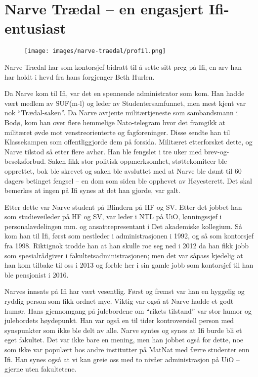 \chapter{Narve Trædal -- en engasjert Ifi-entusiast}

\author{Skrevet av Dag Langmyhr og Arne Maus}

\begin{figure}
	\texttt{[image: images/narve-traedal/profil.png]}
	\label{fig:narve-traedal}
\end{figure}

Narve Trædal har som kontorsjef bidratt til å sette sitt preg på Ifi, en arv han har holdt i hevd fra hans forgjenger Beth Hurlen.

Da Narve kom til Ifi, var det en spennende administrator som kom. Han hadde vært medlem av SUF(m-l) og leder av Studentersamfunnet, men mest kjent var nok ``Trædal-saken''. Da Narve avtjente militærtjeneste som sambandsmann i Bodø, kom han over flere hemmelige Nato-telegram hvor det framgikk at militæret øvde mot venstreorienterte og fagforeninger. Disse sendte han til Klassekampen som offentliggjorde dem på forsida. Militæret etterforsket dette, og Narve tilstod så etter flere avhør. Han ble fengslet i tre uker med brev-og-besøksforbud. Saken fikk stor politisk oppmerksomhet, støttekomiteer ble opprettet, bok ble skrevet og saken ble avsluttet med at Narve ble dømt til 60 dagers betinget fengsel – en dom som siden ble opphevet av Høyesterett. Det skal bemerkes at ingen på Ifi synes at det han gjorde, var galt.

Etter dette var Narve student på Blindern på HF og SV. Etter det jobbet han som studieveileder på HF og SV, var leder i NTL på UiO, lønningssjef i personalavdelingen mm. og ansattrepresentant i Det akademiske kollegium. Så kom han til Ifi, først som nestleder i administrasjonen i 1992, og så som kontorsjef fra 1998. Riktignok trodde han at han skulle roe seg ned i 2012 da han fikk jobb som spesialrådgiver i fakultetsadministrasjonen; men det var såpass kjedelig at han kom tilbake til oss i 2013 og forble her i sin gamle jobb som kontorsjef til han ble pensjonist i 2016.

Narves innsats på Ifi har vært vesentlig. Først og fremst var han en hyggelig og ryddig person som fikk ordnet mye. Viktig var også at Narve hadde et godt humør. Hans gjennomgang på julebordene om ``rikets tilstand'' var stor humor og julebordets høydepunkt. Han var også en til tider kontroversiell person med synspunkter som ikke ble delt av alle. Narve syntes og synes at Ifi burde bli et eget fakultet. Det var ikke bare en mening, men han jobbet også for dette, noe som ikke var populært hos andre institutter på MatNat med færre studenter enn Ifi. Han synes også at vi kan greie oss med to nivåer administrasjon på UiO – gjerne uten fakultetene. 

